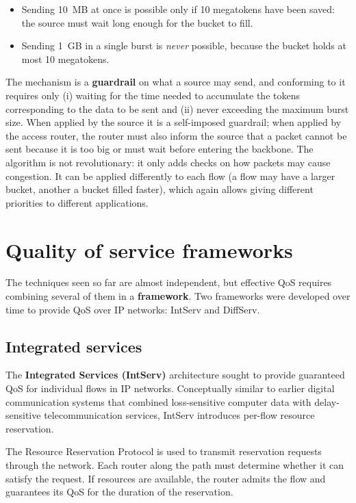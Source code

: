 \begin{itemize}
	\item Sending 10~MB at once is possible only if 10 megatokens have been saved: the source must wait long enough for the bucket to fill.
	\item Sending 1~GB in a single burst is \emph{never} possible, because the bucket holds at most 10 megatokens.
\end{itemize}

The mechanism is a \textbf{guardrail} on what a source may send, and conforming to it requires only (i) waiting for the time needed to accumulate the tokens corresponding to the data to be sent and (ii) never exceeding the maximum burst size. When applied by the source it is a self-imposed guardrail; when applied by the access router, the router must also inform the source that a packet cannot be sent because it is too big or must wait before entering the backbone. The algorithm is not revolutionary: it only adds checks on how packets may cause congestion. It can be applied differently to each flow (a flow may have a larger bucket, another a bucket filled faster), which again allows giving different priorities to different applications.

\section{Quality of service frameworks}

The techniques seen so far are almost independent, but effective QoS requires combining several of them in a \textbf{framework}. Two frameworks were developed over time to provide QoS over IP networks: IntServ and DiffServ.

\subsection{Integrated services}

The \textbf{Integrated Services (IntServ)} architecture sought to provide guaranteed QoS for individual flows in IP networks. Conceptually similar to earlier digital communication systems that combined loss-sensitive computer data with delay-sensitive telecommunication services, IntServ introduces per-flow resource reservation.

The Resource Reservation Protocol is used to transmit reservation requests through the network. Each router along the path must determine whether it can satisfy the request. If resources are available, the router admits the flow and guarantees its QoS for the duration of the reservation.

